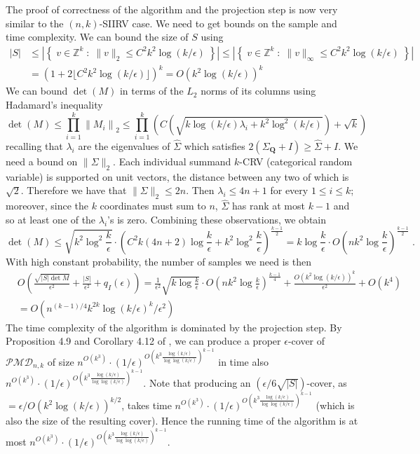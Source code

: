 \documentclass[11pt]{article}
\theoremstyle{definition}
\newcommand{\Z}{\mathbb{Z}}
\newcommand{\q}{\mathbf{Q}}
\newcommand{\wh}[1]{{\fourier{#1}}}
\newcommand{\eps}{\epsilon}
\newcommand{\abs}[1]{\lvert#1\rvert}
\newcommand{\norm}[1]{\lVert#1\rVert}
\newcommand{\normtwo}[1]{{\norm{#1}}_2}
\renewcommand{\abs}[1]{\left\lvert #1 \right\rvert}
\newcommand{\setOfSuchThat}[2]{ \left\{\; #1 \;\colon\; #2\; \right\} } 			\newcommand{\clg}[1]{\left\lceil #1 \right\rceil}
\newcommand{\bigO}[1]{{O\left( #1 \right)}}
\newcommand{\classpmd}[2][n]{\ensuremath{\mathcal{PMD}_{#1,#2}}\xspace}
\newcommand{\fourier}[1]{\widehat{#1}}
\begin{document}
The proof of correctness of the algorithm and the projection step is now very similar to the $(n,k)$-SIIRV case. We need to get bounds on the sample and time complexity.
We can bound the size of $S$ using
\begin{align*}
|S| & \leq \abs{\setOfSuchThat{ v\in \Z^k }{ \|v\|_2 \leq  C^2 k^2 \log(k/\eps) }} 
\leq \abs{\setOfSuchThat{ v\in \Z^k }{ \|v\|_\infty \leq  C^2 k^2 \log(k/\eps) }} \\
&= \left(1+2\lfloor C^2 k^2 \log(k/\eps)\rfloor \right)^k  
 = O(k^2\log(k/\eps))^k
\end{align*}
We can bound $\det(M)$ in terms of the $L_2$ norms of its columns using Hadamard's inequality
\[
  \det(M) \leq \prod_{i=1}^k \normtwo{M_i} \leq \prod_{i=1}^k \left( C \left(\sqrt{k \log(k/\eps)\lambda_i+k^2\log^2(k/\eps)}\right) + \sqrt{k} \right)
\]
recalling that $\lambda_i$ are the eigenvalues of $\wh{\Sigma}$ which satisfies $2(\Sigma_\q+I) \geq \wh{\Sigma}+I$.
 We need a bound on $\|\Sigma\|_2$. Each individual summand $k$-CRV (categorical random variable) is supported on unit vectors, the distance between any two of which is $\sqrt{2}$. Therefore we have that $\|\Sigma\|_2 \leq 2n$. Then $\lambda_i \leq 4n+1$ for every $1\leq i\leq k$; moreover, since the $k$ coordinates must sum to $n$, $\wh{\Sigma}$ has rank at most $k-1$ and so at least one of the $\lambda_i$'s is zero. Combining these observations, we obtain
\[
    \det(M) \leq \sqrt{k^2\log^2\frac{k}{\eps}}\cdot \left(C^2 k(4n+2) \log\frac{k}{\eps} + k^2\log^2\frac{k}{\eps}\right)^{\frac{k-1}{2}} = k\log\frac{k}{\eps}\cdot \bigO{nk^2 \log\frac{k}{\eps}}^{\frac{k-1}{2}} \; .
\]
With high constant probability, the number of samples we need is then
 \begin{align*}
 & \bigO{ \frac{\sqrt{\abs{S}\det{M}}}{\eps^2} + \frac{\abs{S}}{\eps^2} + q_I(\eps)  } = 
  \frac{1}{\eps^2}\sqrt{k\log\frac{k}{\eps}}\cdot \bigO{nk^2 \log\frac{k}{\eps}}^{\frac{k-1}{4}} + \frac{O(k^2\log(k/\eps))^{k}}{\eps^2} + O(k^4) \\
 &= O(n^{(k-1)/4} k^{2k} \log(k/\eps)^k/\eps^2)
 \end{align*}
 The time complexity of the algorithm is dominated by the projection step. By Proposition 4.9 and Corollary 4.12 of \cite{DKS15c}, we can produce a proper
 $\eps$-cover of $\classpmd[n]{k}$ of size $n^{O(k^3)} \cdot (1/\eps)^{O(k^3\frac{\log(k/\eps)}{\log\log(k/\eps)})^{k-1}}$ in time also $n^{O(k^3)} \cdot (1/\eps)^{O(k^3\frac{\log(k/\eps)}{\log\log(k/\eps)})^{k-1}}$. Note that producing an $(\eps/6\sqrt{|S|})$-cover, as $=\eps/O(k^2\log(k/\eps))^{k/2}$, takes time $n^{O(k^3)} \cdot (1/\eps)^{O(k^3\frac{\log(k/\eps)}{\log\log(k/\eps)})^{k-1}}$ (which is also the size of the resulting cover). Hence the running time of the algorithm is at most $n^{O(k^3)} \cdot (1/\eps)^{O(k^3\frac{\log(k/\eps)}{\log\log(k/\eps)})^{k-1}}$.
\end{document}
